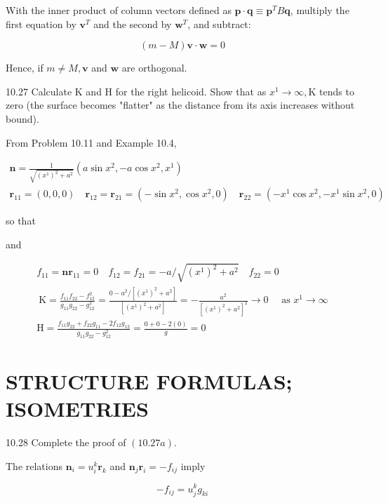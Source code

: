 \documentclass[10pt]{article}
\begin{document}
With the inner product of column vectors defined as $\mathbf{p} \cdot \mathbf{q} \equiv \mathbf{p}^{T} B \mathbf{q}$, multiply the first equation by $\mathbf{v}^{T}$ and the second by $\mathbf{w}^{T}$, and subtract:

$$
(m-M) \mathbf{v} \cdot \mathbf{w}=0
$$

Hence, if $m \neq M, \mathbf{v}$ and $\mathbf{w}$ are orthogonal.

10.27 Calculate $\mathrm{K}$ and $\mathrm{H}$ for the right helicoid. Show that as $x^{1} \rightarrow \infty, \mathrm{K}$ tends to zero (the surface becomes "flatter" as the distance from its axis increases without bound).

From Problem 10.11 and Example 10.4,

$$
\begin{gathered}
\mathbf{n}=\frac{1}{\sqrt{\left(x^{1}\right)^{2}+a^{2}}}\left(a \sin x^{2},-a \cos x^{2}, x^{1}\right) \\
\mathbf{r}_{11}=(0,0,0) \quad \mathbf{r}_{12}=\mathbf{r}_{21}=\left(-\sin x^{2}, \cos x^{2}, 0\right) \quad \mathbf{r}_{22}=\left(-x^{1} \cos x^{2},-x^{1} \sin x^{2}, 0\right)
\end{gathered}
$$

so that

and

$$
\begin{gathered}
f_{11}=\mathbf{n r}_{11}=0 \quad f_{12}=f_{21}=-a / \sqrt{\left(x^{1}\right)^{2}+a^{2}} \quad f_{22}=0 \\
\mathrm{~K}=\frac{f_{11} f_{22}-f_{12}^{2}}{g_{11} g_{22}-g_{12}^{2}}=\frac{0-a^{2} /\left[\left(x^{1}\right)^{2}+a^{2}\right]}{\left[\left(x^{1}\right)^{2}+a^{2}\right]}=-\frac{a^{2}}{\left[\left(x^{1}\right)^{2}+a^{2}\right]^{2}} \rightarrow 0 \quad \text { as } x^{1} \rightarrow \infty \\
\mathrm{H}=\frac{f_{11} g_{22}+f_{22} g_{11}-2 f_{12} g_{12}}{g_{11} g_{22}-g_{12}^{2}}=\frac{0+0-2(0)}{g}=0
\end{gathered}
$$

\section*{STRUCTURE FORMULAS; ISOMETRIES}
10.28 Complete the proof of $(10.27 a)$.

The relations $\mathbf{n}_{i}=u_{i}^{k} \mathbf{r}_{k}$ and $\mathbf{n}_{j} \mathbf{r}_{i}=-f_{i j}$ imply

$$
-f_{i j}=u_{j}^{k} g_{k i}
$$
\end{document}
